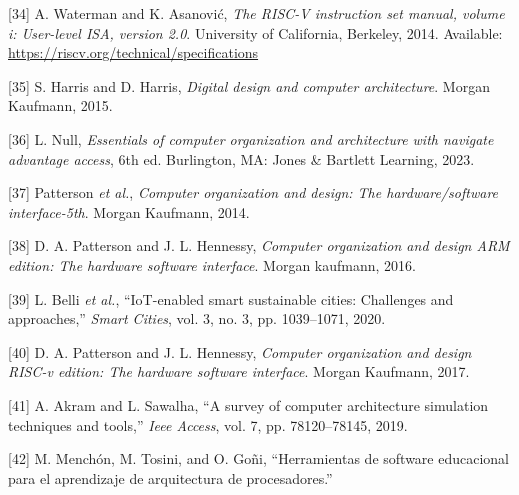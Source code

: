 \documentclass[12pt,oneside]{templates/unerthesis}
\newcommand{\CSLLeftMargin}[1]{#1} %
\newcommand{\CSLRightInline}[1]{#1} %
\newlength{\cslhangindent}
\newenvironment{CSLReferences}[2] %
 {\setlength{\parindent}{0pt}%
  \setlength{\leftskip}{#1 pt\relax}%
  \setlength{\parskip}{#2 pt\relax}%
  \everypar{\setlength{\hangindent}{\cslhangindent}}}
 {\par}
\begin{document}
\begin{CSLReferences}{0}{0}
\leavevmode{}%
\CSLLeftMargin{{[}34{]} }%
\CSLRightInline{A. Waterman and K. Asanović, \emph{The {RISC}-{V} instruction set manual, volume i: User-level ISA, version 2.0}. University of California, Berkeley, 2014. Available: \url{https://riscv.org/technical/specifications}}

\leavevmode{}%
\CSLLeftMargin{{[}35{]} }%
\CSLRightInline{S. Harris and D. Harris, \emph{Digital design and computer architecture}. Morgan Kaufmann, 2015.}

\leavevmode{}%
\CSLLeftMargin{{[}36{]} }%
\CSLRightInline{L. Null, \emph{Essentials of computer organization and architecture with navigate advantage access}, 6th ed. Burlington, MA: Jones \& Bartlett Learning, 2023.}

\leavevmode{}%
\CSLLeftMargin{{[}37{]} }%
\CSLRightInline{Patterson \emph{et al.}, \emph{Computer organization and design: The hardware/software interface-5th}. Morgan Kaufmann, 2014.}

\leavevmode{}%
\CSLLeftMargin{{[}38{]} }%
\CSLRightInline{D. A. Patterson and J. L. Hennessy, \emph{Computer organization and design ARM edition: The hardware software interface}. Morgan kaufmann, 2016.}

\leavevmode{}%
\CSLLeftMargin{{[}39{]} }%
\CSLRightInline{L. Belli \emph{et al.}, {``IoT-enabled smart sustainable cities: Challenges and approaches,''} \emph{Smart Cities}, vol. 3, no. 3, pp. 1039--1071, 2020.}

\leavevmode{}%
\CSLLeftMargin{{[}40{]} }%
\CSLRightInline{D. A. Patterson and J. L. Hennessy, \emph{Computer organization and design RISC-v edition: The hardware software interface}. Morgan Kaufmann, 2017.}

\leavevmode{}%
\CSLLeftMargin{{[}41{]} }%
\CSLRightInline{A. Akram and L. Sawalha, {``A survey of computer architecture simulation techniques and tools,''} \emph{Ieee Access}, vol. 7, pp. 78120--78145, 2019.}

\leavevmode{}%
\CSLLeftMargin{{[}42{]} }%
\CSLRightInline{M. Menchón, M. Tosini, and O. Goñi, {``Herramientas de software educacional para el aprendizaje de arquitectura de procesadores.''}}


\end{CSLReferences}
\end{document}
